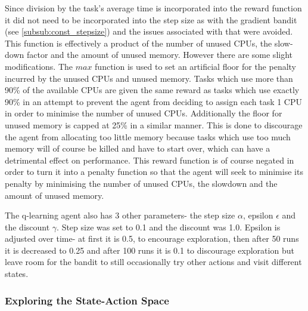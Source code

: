 Since division by the task’s average time is incorporated into the reward function it did not need to be incorporated into the step size as with the gradient bandit (see \ref{subsub:const_stepsize}) and the issues associated with that were avoided. This function is effectively a product of the number of unused CPUs, the slow-down factor and the amount of unused memory. However there are some slight modifications. The $max$ function is used to set an artificial floor for the penalty incurred by the unused CPUs and unused memory. Tasks which use more than 90\% of the available CPUs are given the same reward as tasks which use exactly 90\% in an attempt to prevent the agent from deciding to assign each task 1 CPU in order to minimise the number of unused CPUs. Additionally the floor for unused memory is capped at 25\% in a similar manner. This is done to discourage the agent from allocating too little memory because tasks which use too much memory will of course be killed and have to start over, which can have a detrimental effect on performance. This reward function is of course negated in order to turn it into a penalty function so that the agent will seek to minimise its penalty by minimising the number of unused CPUs, the slowdown and the amount of unused memory.

The q-learning agent also has 3 other parameters- the step size $\alpha$, epsilon $\epsilon$ and the discount $\gamma$. Step size was set to 0.1 and the discount was 1.0. Epsilon is adjusted over time- at first it is 0.5, to encourage exploration, then after 50 runs it is decreased to 0.25 and after 100 runs it is 0.1 to discourage exploration but leave room for the bandit to still occasionally try other actions and visit different states.

\subsubsection{Exploring the State-Action Space}
\label{subsub:states}

